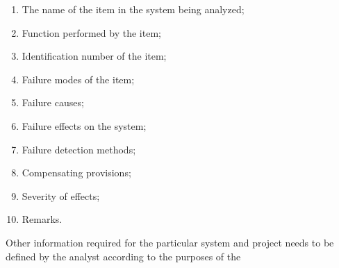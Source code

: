 \documentclass[./dissertation.tex]{subfiles}
\begin{document}
\begin{enumerate}
\item The name of the item in the system being analyzed;
\item Function performed by the item;
\item Identification number of the item;
\item Failure modes of the item;
\item Failure causes;
\item Failure effects on the system;
\item Failure detection methods;
\item Compensating provisions;
\item Severity of effects;
\item Remarks.
\end{enumerate}
Other information required for the particular system and project needs to be defined by the analyst according to the purposes of the
\end{document}
